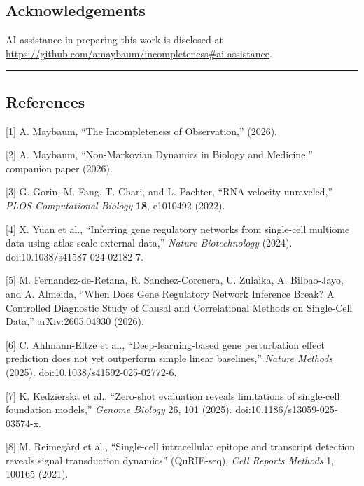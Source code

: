 \documentclass[
]{article}
\begin{document}
\hypertarget{acknowledgements}{%
\subsection{Acknowledgements}\label{acknowledgements}}

AI assistance in preparing this work is disclosed at\\
\url{https://github.com/amaybaum/incompleteness\#ai-assistance}.

\begin{center}\rule{0.5\linewidth}{0.5pt}\end{center}

\hypertarget{references}{%
\subsection{References}\label{references}}

{[}1{]} A. Maybaum, ``The Incompleteness of Observation,'' (2026).

{[}2{]} A. Maybaum, ``Non-Markovian Dynamics in Biology and Medicine,''
companion paper (2026).

{[}3{]} G. Gorin, M. Fang, T. Chari, and L. Pachter, ``RNA velocity
unraveled,'' \emph{PLOS Computational Biology} \textbf{18}, e1010492
(2022).

{[}4{]} X. Yuan et al., ``Inferring gene regulatory networks from
single-cell multiome data using atlas-scale external data,''
\emph{Nature Biotechnology} (2024). doi:10.1038/s41587-024-02182-7.

{[}5{]} M. Fernandez-de-Retana, R. Sanchez-Corcuera, U. Zulaika, A.
Bilbao-Jayo, and A. Almeida, ``When Does Gene Regulatory Network
Inference Break? A Controlled Diagnostic Study of Causal and
Correlational Methods on Single-Cell Data,'' arXiv:2605.04930 (2026).

{[}6{]} C. Ahlmann-Eltze et al., ``Deep-learning-based gene perturbation
effect prediction does not yet outperform simple linear baselines,''
\emph{Nature Methods} (2025). doi:10.1038/s41592-025-02772-6.

{[}7{]} K. Kedzierska et al., ``Zero-shot evaluation reveals limitations
of single-cell foundation models,'' \emph{Genome Biology} 26, 101
(2025). doi:10.1186/s13059-025-03574-x.

{[}8{]} M. Reimegård et al., ``Single-cell intracellular epitope and
transcript detection reveals signal transduction dynamics'' (QuRIE-seq),
\emph{Cell Reports Methods} 1, 100165 (2021).
\end{document}
